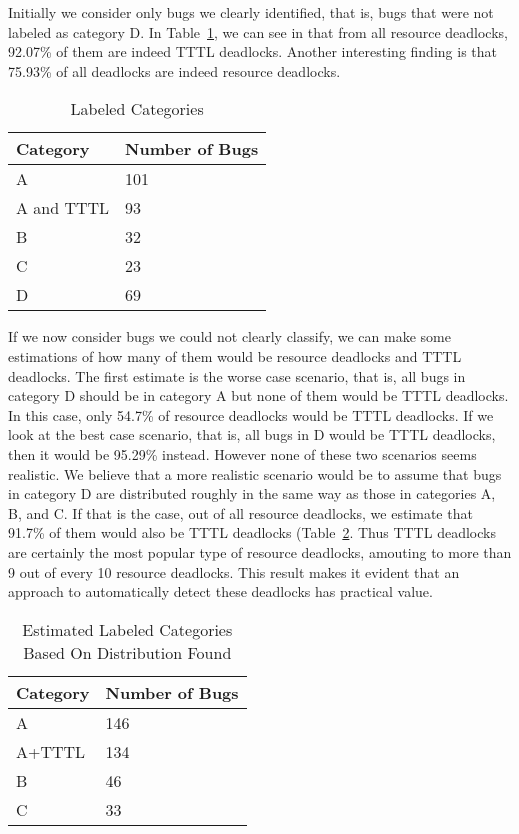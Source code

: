 Initially we  consider only bugs we clearly identified, that is, bugs that were not labeled as category D.
In Table~\ref{tab:categ}, we can see in that from all resource deadlocks, 92.07\% of them are indeed TTTL deadlocks.
Another interesting finding is that 75.93\% of all deadlocks are indeed resource deadlocks.

\begin{table}
\begin{center}
\caption{Labeled Categories}\label{tab:categ}
\begin{tabular}{|l|l|}
\hline
Category & Number of Bugs \\
\hline
A & 101 \\
A and TTTL & 93 \\
B & 32 \\
C & 23 \\
D & 69 \\
\hline
\end{tabular}
\end{center}
\end{table}

If we now consider bugs we could not clearly classify, we can make some estimations of how many of them would be resource deadlocks and TTTL deadlocks. The first estimate is the worse case scenario, that is, all bugs in category D should be in category A but none of them would be TTTL deadlocks. In this case, only 54.7\% of resource deadlocks would be TTTL deadlocks. If we look at the best case scenario, that is, all bugs in D would be TTTL deadlocks, then it would be 95.29\% instead. However none of these two scenarios seems realistic. We believe that a more realistic scenario would be to assume that bugs in category D are distributed roughly in the same way as those in categories A, B, and C. If that is the case, out of all resource deadlocks, we estimate that 91.7\% of them would also be TTTL deadlocks (Table~\ref{tab:estcateg}. Thus TTTL deadlocks are certainly the most popular type of resource deadlocks, amouting to more than 9 out of every 10 resource deadlocks. This result makes it evident that an approach to automatically detect these deadlocks has practical value.  


\begin{table}
\begin{center}
\caption{Estimated Labeled Categories Based On Distribution Found}\label{tab:estcateg}
\begin{tabular}{|l|l|}
\hline
Category & Number of Bugs \\
\hline
A & 146 \\  
A+TTTL &  134 \\
B & 46 \\
C & 33 \\
\hline
\end{tabular}
\end{center}
\end{table}


